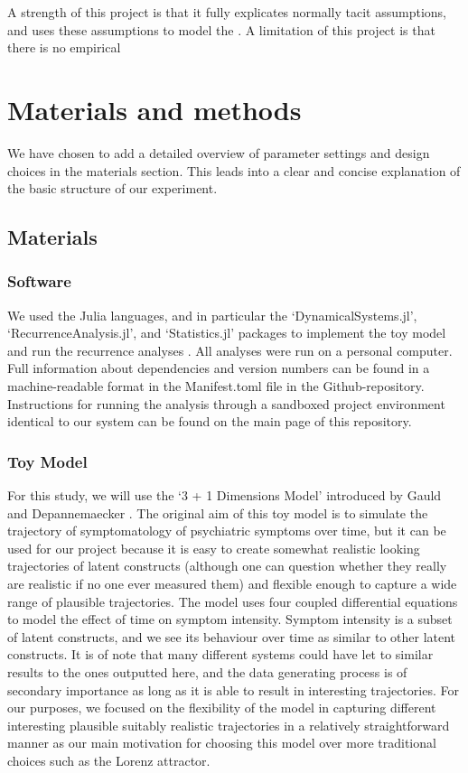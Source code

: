 \documentclass[utf8]{FrontiersinVancouver}
\begin{document}
A strength of this project is that it fully explicates normally tacit assumptions, and uses these assumptions to model the . A limitation of this project is that there is no empirical 

\section{Materials and methods}

We have chosen to add a detailed overview of parameter settings and design choices in the materials section. This leads into a clear and concise explanation of the basic structure of our experiment. 

\subsection{Materials}

\subsubsection{Software}
We used the Julia languages, and in particular the `DynamicalSystems.jl', `RecurrenceAnalysis.jl', and `Statistics.jl' packages to implement the toy model and run the recurrence analyses \citep{bezanson2017julia, Datseris2018, DatserisParlitz2022}. All analyses were run on a personal computer. Full information about dependencies and version numbers can be found in a machine-readable format in the Manifest.toml file in the Github-repository. Instructions for running the analysis through a sandboxed project environment identical to our system can be found on the main page of this repository.

\subsubsection{Toy Model}
For this study, we will use the `3 + 1 Dimensions Model' introduced by Gauld and Depannemaecker \citep{gauldDynamicalSystemsComputational2023}. The original aim of this toy model is to simulate the trajectory of symptomatology of psychiatric symptoms over time, but it can be used for our project because it is easy to create somewhat realistic looking trajectories of latent constructs (although one can question whether they really are realistic if no one ever measured them) and flexible enough to capture a wide range of plausible trajectories. The model uses four coupled differential equations to model the effect of time on symptom intensity. Symptom intensity is a subset of latent constructs, and we see its behaviour over time as similar to other latent constructs. It is of note that many different systems could have let to similar results to the ones outputted here, and the data generating process is of secondary importance as long as it is able to result in interesting trajectories. For our purposes, we focused on the flexibility of the model in capturing different interesting plausible suitably realistic trajectories in a relatively straightforward manner as our main motivation for choosing this model over more traditional choices such as the Lorenz attractor.  
\end{document}
